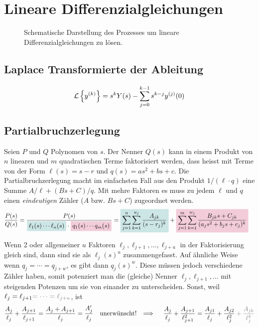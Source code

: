 \section{Lineare Differenzialgleichungen}
\begin{figure}[H] \centering
  
  \caption{
    Schematische Darstellung des Prozesses um lineare Differenzialgleichungen
    zu l\"osen.
  }
\end{figure}

\subsection{Laplace Transformierte der Ableitung}
\[
  \mathcal{L}\left\{ y^{(k)} \right\} =
  s^k Y(s) - \sum_{j = 0}^{k - 1} s^{k-j} y^{(j)}(0)
\]

\subsection{Partialbruchzerlegung}
Seien \(P\) und \(Q\) Polynomen von \(s\).
Der Nenner \(Q(s)\) kann in einem Produkt von \(n\) linearen und \(m\)
quadratischen Terme faktorisiert werden, dass heisst mit Terme von der Form
\(\ell (s) = s - r\) und \(q(s) = a s^2 + b s + c\).
%
Die Partialbruchzerlegung macht im einfachsten Fall aus den Produkt
\(1/(\ell \cdot q)\) eine Summe \(A/\ell + (Bs + C)/q\). Mit mehre Faktoren es
muss zu jedem \(\ell\) und \(q\) einen \emph{eindeutigen} Z\"ahler (\(A\) bzw.
\(Bs + C\)) zugeordnet werden.
%
\begin{align*}
  \frac{P(s)}{Q(s)}
  =
  \frac{P(s)}{
    \colorbox{teal!20}{\(
      \ell_1(s)\cdots \ell_n(s)
    \)}
    \cdot
    \colorbox{purple!20}{\(
      q_1(s)\cdots q_m(s)
    \)}
  }
  &=
  \colorbox{teal!20}{\(\displaystyle
    \sum_{j=1}^n \sum_{k=1}^{u_j} \frac{A_{jk}}{(s - r_j)^k}
  \)}
  +
  \colorbox{purple!20}{\(\displaystyle
    \sum_{j=1}^m \sum_{k=1}^{w_j} \frac{B_{jk} s + C_{jk}}{(a_j s^2 + b_j s + c_j)^k}
  \)}
\end{align*}

Wenn 2 oder allgemeiner \(u\) Faktoren \(\ell_j, \ell_{j+1},\dots,\ell_{j+u}\)
in der Faktorisierung gleich sind, dann sind sie als \(\ell_j(s)^{u}\)
zusammengefasst. Auf \"ahnliche Weise wenn \(q_j = \cdots = q_{j+w}\), es gibt dann
\(q_j(s)^{w}\).
%
Diese m\"ussen jedoch verschiedene Z\"ahler haben, somit potenziert man die
(gleiche) Nenner \(\ell_j, \ell_{j+1}, \dots\) mit steigenden Potenzen um sie
von einander zu unterscheiden.
Sonst, weil
\(\ell_j = \ell_{j+1} \textcolor{gray}{= \cdots = \ell_{j+u}}\), ist
\begin{align*}
  \frac{A_j}{\ell_j} + \frac{A_{j+1}}{\ell_{j+1}} =
    \frac{A_j + A_{j+1}}{\ell_j} = \frac{A'_j}{\ell_j}
  \quad\text{unerw\"unscht! }\implies\quad
  \frac{A_j}{\ell_j} + \frac{A_{j+1}}{\ell_{j+1}^2} =
    \frac{A_{j1}}{\ell_j} + \frac{A_{j2}}{\ell_j^2}
      \begingroup\color{gray}
        + \frac{A_{jk}}{\ell_j^k}
      \endgroup
\end{align*}

